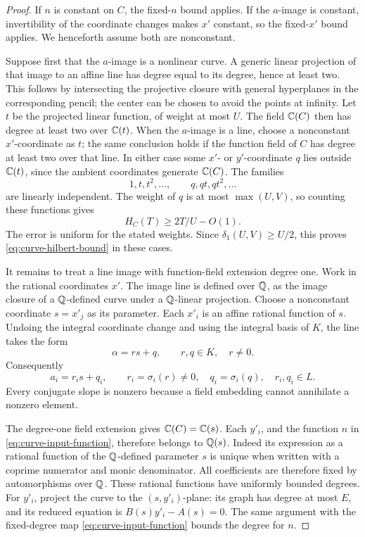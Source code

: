 \begin{proof}
If $n$ is constant on $C$, the fixed-$n$ bound applies.  If the
$a$-image is constant, invertibility of the coordinate changes makes
$x'$ constant, so the fixed-$x'$ bound applies.  We henceforth assume
both are nonconstant.

Suppose first that the $a$-image is a nonlinear curve.  A generic
linear projection of that image to an affine line has degree equal
to its degree, hence at least two.  This follows by intersecting the
projective closure with general hyperplanes in the corresponding
pencil; the center can be chosen to avoid the points at infinity.
Let $t$ be the projected linear function, of weight at most $U$.
The field $\mathbb C(C)$ then has degree at least two over $\mathbb C(t)$.
When the $a$-image is a line, choose a nonconstant $x'$-coordinate as
$t$; the same conclusion holds if the function field of $C$ has
degree at least two over that line.
In either case some $x'$- or $y'$-coordinate $q$ lies outside $\mathbb C(t)$,
since the ambient coordinates generate $\mathbb C(C)$.  The families
\[
 1,t,t^2,\ldots,\qquad q,qt,qt^2,\ldots
\]
are linearly independent.  The weight of $q$ is at most $\max(U,V)$,
so counting these functions gives
\begin{equation}\label{eq:curve-two-families}
 H_C(T)\ge 2T/U-O(1).
\end{equation}
The error is uniform for the stated weights.  Since
$\delta_1(U,V)\ge U/2$, this proves
\eqref{eq:curve-hilbert-bound} in these cases.

It remains to treat a line image with function-field extension degree
one.  Work in the rational coordinates $x'$.  The image line is
defined over $\mathbb Q$, as the image closure of a $\mathbb Q$-defined curve under
a $\mathbb Q$-linear projection.  Choose a nonconstant coordinate
$s=x'_j$ as its parameter.  Each $x'_i$ is an affine rational function
of $s$.  Undoing the integral coordinate change and using the integral
basis of $K$, the line takes the form
\[
 \alpha=rs+q,\qquad r,q\in K,\quad r\ne0.
\]
Consequently
\begin{equation}\label{eq:curve-conjugate-line}
 a_i=r_i s+q_i,\qquad
 r_i=\sigma_i(r)\ne0,\quad q_i=\sigma_i(q),\quad r_i,q_i\in L.
\end{equation}
Every conjugate slope is nonzero because a field embedding cannot
annihilate a nonzero element.

The degree-one field extension gives $\mathbb C(C)=\mathbb C(s)$.  Each $y'_i$, and
the function $n$ in \eqref{eq:curve-input-function}, therefore belongs
to $\mathbb Q(s)$.  Indeed its expression as a rational function of the
$\mathbb Q$-defined parameter $s$ is unique when written with a coprime
numerator and monic denominator.  All coefficients are therefore fixed
by automorphisms over $\mathbb Q$.  These rational functions have uniformly
bounded degrees.
For $y'_i$, project the curve to the $(s,y'_i)$-plane: its graph has
degree at most $E$, and its reduced equation is
$B(s)y'_i-A(s)=0$.  The same argument with the fixed-degree map
\eqref{eq:curve-input-function} bounds the degree for $n$.


\end{proof}
